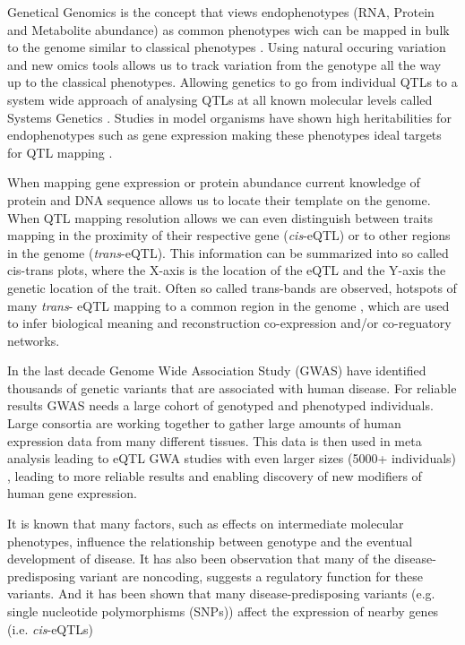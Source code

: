 Genetical Genomics is the concept that views endophenotypes (RNA, Protein and Metabolite abundance) 
as common phenotypes wich can be mapped in bulk to the genome similar to classical 
phenotypes \cite{Jansen:2001a}. Using natural occuring variation and new omics tools allows us 
to track variation from the genotype all the way up to the classical phenotypes. Allowing 
genetics to go from individual QTLs to a system wide approach of analysing QTLs at all known 
molecular levels called Systems Genetics \cite{Threadgill:2006}. Studies in model organisms 
have shown high heritabilities for endophenotypes such as gene expression making these phenotypes 
ideal targets for QTL mapping \cite{Brem:2002}. 

When mapping gene expression or protein abundance current knowledge of protein and DNA sequence 
allows us to locate their template on the genome. When QTL mapping resolution allows we can even 
distinguish between traits mapping in the proximity of their respective gene (\emph{cis}-eQTL) 
or to other regions in the genome (\emph{trans}-eQTL). This information can be summarized into 
so called cis-trans plots, where the X-axis is the location of the eQTL and the Y-axis the genetic 
location of the trait. Often so called trans-bands are observed, hotspots of many \emph{trans}-
eQTL mapping to a common region in the genome \cite{Breitling:2008a}, which are used to infer 
biological meaning and reconstruction co-expression and/or co-reguatory networks.

In the last decade Genome Wide Association Study (GWAS) have identified thousands of genetic 
variants that are associated with human disease\cite{Hindorff:2009}. For reliable results GWAS 
needs a large cohort of genotyped and phenotyped individuals. Large consortia are working 
together to gather large amounts of human expression data from many different tissues. This 
data is then used in meta analysis leading to eQTL GWA studies with even larger sizes 
(5000+ individuals) \cite{Lude:2011}, leading to more reliable results and enabling discovery 
of new modifiers of human gene expression.

It is known that many factors, such as effects on intermediate molecular phenotypes, influence 
the relationship between genotype and the eventual development of disease. It has also been 
observation that many of the disease-predisposing variant are noncoding, suggests a regulatory 
function for these variants. And it has been shown that many disease-predisposing variants 
(e.g. single nucleotide polymorphisms (SNPs)) affect the expression of nearby genes (i.e. 
\emph{cis}-eQTLs)\cite{Powell:2012, Lude:2011, Zeller:2010}

